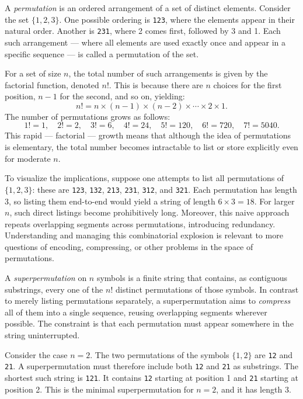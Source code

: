 A \emph{permutation} is an ordered arrangement of a set of distinct elements. Consider the set $\{1, 2, 3\}$. One possible ordering is \texttt{123}, where the elements appear in their natural order. Another is \texttt{231}, where 2 comes first, followed by 3 and 1. Each such arrangement — where all elements are used exactly once and appear in a specific sequence — is called a permutation of the set.

For a set of size $n$, the total number of such arrangements is given by the factorial function, denoted $n!$. This is because there are $n$ choices for the first position, $n-1$ for the second, and so on, yielding:
\[
n! = n \times (n-1) \times (n-2) \times \cdots \times 2 \times 1.
\]
The number of permutations grows as follows:
\[
1! = 1,\quad 2! = 2,\quad 3! = 6,\quad 4! = 24,\quad 5! = 120,\quad 6! = 720,\quad 7! = 5040.
\]
This rapid — factorial — growth means that although the idea of permutations is elementary, the total number becomes intractable to list or store explicitly even for moderate $n$.

To visualize the implications, suppose one attempts to list all permutations of $\{1, 2, 3\}$: these are \texttt{123}, \texttt{132}, \texttt{213}, \texttt{231}, \texttt{312}, and \texttt{321}. Each permutation has length 3, so listing them end-to-end would yield a string of length $6 \times 3 = 18$. For larger $n$, such direct listings become prohibitively long. Moreover, this naive approach repeats overlapping segments across permutations, introducing redundancy. Understanding and managing this combinatorial explosion is relevant to more questions of encoding, compressing, or other problems in the space of permutations.

A \emph{superpermutation} on $n$ symbols is a finite string that contains, as contiguous substrings, every one of the $n!$ distinct permutations of those symbols. In contrast to merely listing permutations separately, a superpermutation aims to \emph{compress} all of them into a single sequence, reusing overlapping segments wherever possible. The constraint is that each permutation must appear somewhere in the string uninterrupted.

Consider the case $n = 2$. The two permutations of the symbols $\{1, 2\}$ are \texttt{12} and \texttt{21}. A superpermutation must therefore include both \texttt{12} and \texttt{21} as substrings. The shortest such string is \texttt{121}. It contains \texttt{12} starting at position 1 and \texttt{21} starting at position 2. This is the minimal superpermutation for $n = 2$, and it has length 3.

